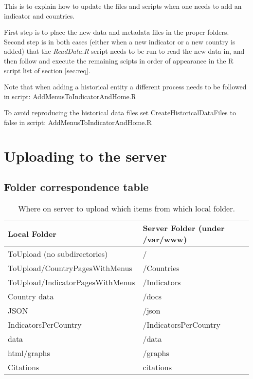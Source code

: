 \documentclass[a4paper]{article}
\begin{document}
This is to explain how to update the files and scripts when one needs to add an 
indicator and countries.

First step is to place the new data and metadata files in the proper folders. 
Second step is in both cases (either when a new indicator or a new country is 
added) that the \textit{ReadData.R} script needs to be run to read the new data 
in, and then follow and execute the remaining scipts in order of appearance in 
the R script list of section \ref{sec:req}.

Note that when adding a historical entity a different process needs to be 
followed in script: AddMenusToIndicatorAndHome.R

To avoid reproducing the historical data files set CreateHistoricalDataFiles to 
false in script: AddMenusToIndicatorAndHome.R

\clearpage
\section{Uploading to the server}

\subsection{Folder correspondence table}

\begin{table}[h]
\centering
\caption{Where on server to upload which items from which local folder.}
\label{tab:uncertainty}
\begin{tabular}{l | l}
  \toprule
  Local Folder & Server Folder (under /var/www) \\
  \midrule
  ToUpload (no subdirectories) & / \\
  ToUpload/CountryPagesWithMenus & /Countries \\
  ToUpload/IndicatorPagesWithMenus & /Indicators \\
  Country data & /docs \\
  JSON & /json \\
  IndicatorsPerCountry & /IndicatorsPerCountry \\
  data & /data \\
  html/graphs & /graphs \\
  Citations & citations \\
  \bottomrule
\end{tabular}
\end{table}
\end{document}
